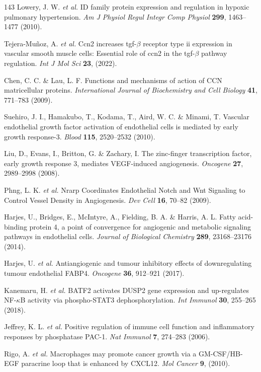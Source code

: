\documentclass[12pt]{article}
\begin{document}
\begin{thebibliography}{143}
 Lowery, J. W. \textit{et al.} ID family protein expression and regulation in hypoxic pulmonary hypertension. \textit{Am J Physiol Regul Integr Comp Physiol} \textbf{299}, 1463--1477 (2010).

 Tejera-Muñoz, A. \textit{et al.} Ccn2 increases tgf-$\beta$ receptor type ii expression in vascular smooth muscle cells: Essential role of ccn2 in the tgf-$\beta$ pathway regulation. \textit{Int J Mol Sci} \textbf{23}, (2022).

 Chen, C. C. \& Lau, L. F. Functions and mechanisms of action of CCN matricellular proteins. \textit{International Journal of Biochemistry and Cell Biology} \textbf{41}, 771--783 (2009).

 Suehiro, J. I., Hamakubo, T., Kodama, T., Aird, W. C. \& Minami, T. Vascular endothelial growth factor activation of endothelial cells is mediated by early growth response-3. \textit{Blood} \textbf{115}, 2520--2532 (2010).

 Liu, D., Evans, I., Britton, G. \& Zachary, I. The zinc-finger transcription factor, early growth response 3, mediates VEGF-induced angiogenesis. \textit{Oncogene} \textbf{27}, 2989--2998 (2008).

 Phng, L. K. \textit{et al.} Nrarp Coordinates Endothelial Notch and Wnt Signaling to Control Vessel Density in Angiogenesis. \textit{Dev Cell} \textbf{16}, 70--82 (2009).

 Harjes, U., Bridges, E., McIntyre, A., Fielding, B. A. \& Harris, A. L. Fatty acid-binding protein 4, a point of convergence for angiogenic and metabolic signaling pathways in endothelial cells. \textit{Journal of Biological Chemistry} \textbf{289}, 23168--23176 (2014).

 Harjes, U. \textit{et al.} Antiangiogenic and tumour inhibitory effects of downregulating tumour endothelial FABP4. \textit{Oncogene} \textbf{36}, 912--921 (2017).

 Kanemaru, H. \textit{et al.} BATF2 activates DUSP2 gene expression and up-regulates NF-$\kappa$B activity via phospho-STAT3 dephosphorylation. \textit{Int Immunol} \textbf{30}, 255--265 (2018).

 Jeffrey, K. L. \textit{et al.} Positive regulation of immune cell function and inflammatory responses by phosphatase PAC-1. \textit{Nat Immunol} \textbf{7}, 274--283 (2006).

 Rigo, A. \textit{et al.} Macrophages may promote cancer growth via a GM-CSF/HB-EGF paracrine loop that is enhanced by CXCL12. \textit{Mol Cancer} \textbf{9}, (2010).


\end{thebibliography}
\end{document}
